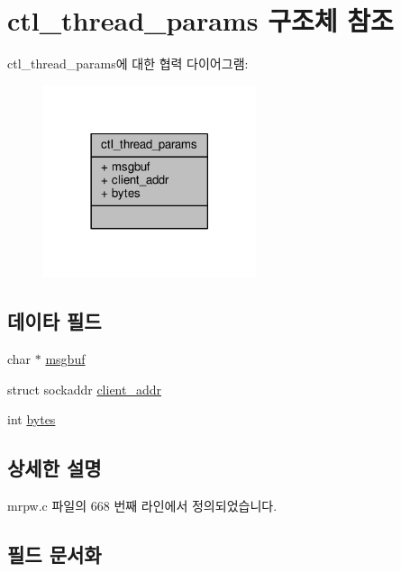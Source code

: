 \hypertarget{structctl__thread__params}{}\section{ctl\+\_\+thread\+\_\+params 구조체 참조}
\label{structctl__thread__params}


ctl\+\_\+thread\+\_\+params에 대한 협력 다이어그램\+:
\nopagebreak
\begin{figure}[H]
\begin{center}
\leavevmode
\includegraphics[width=177pt]{structctl__thread__params__coll__graph}
\end{center}
\end{figure}
\subsection*{데이타 필드}
\begin{DoxyCompactItemize}
\item 
char $\ast$ \hyperlink{structctl__thread__params_a3820841c4bbf28f04505bea65d6b84f7}{msgbuf}
\item 
struct sockaddr \hyperlink{structctl__thread__params_a877f810975609de209847d7157b0ba67}{client\+\_\+addr}
\item 
int \hyperlink{structctl__thread__params_a3e18e5ab1201e205ce88c473a2f4bf99}{bytes}
\end{DoxyCompactItemize}


\subsection{상세한 설명}


mrpw.\+c 파일의 668 번째 라인에서 정의되었습니다.



\subsection{필드 문서화}
